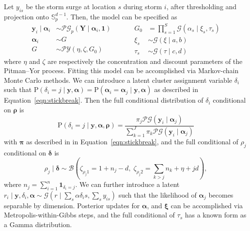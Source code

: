 Let $y_{is}$ be the storm surge at location $s$ during storm $i$, after thresholding 
    and projection onto $\mathbb{S}_p^{d-1}$.  Then, the model can be specified as
    \begin{equation}
        \label{eqn:pypg}
        \begin{aligned}
            \bm{y}_i \mid \bm{\alpha}_i &\sim
                \mathcal{PG}_p\left(\bm{Y}\mid\bm{\alpha}_i,\bm{1}\right)\\
            \bm{\alpha}_i &\sim G\\
            G &\sim \mathcal{PY}\left(\eta, \zeta, G_0\right)        
        \end{aligned}
        ~\hspace{1cm}
        \begin{aligned}
            G_0 &= {\textstyle\prod}_{s = 1}^{S}
                \mathcal{G}(\alpha_{s}\mid \xi_{s},\tau_{s})\\
            \xi_{s} &\sim \mathcal{G}(\xi\mid a, b)\\
            \tau_{s} &\sim \mathcal{G}(\tau\mid c, d)
        \end{aligned} 
    \end{equation}
    where $\eta$ and $\zeta$ are respectively the concentration and discount parameters
    of the Pitman--Yor process.  Fitting this model can be accomplished via Markov-chain 
    Monte Carlo methods. We can introduce a latent cluster assignment variable $\delta_i$ 
    such that 
    $\text{P}\left(\delta_i = j\mid\bm{y},\bm{\alpha}\right) = 
        \text{P}\left(\bm{\alpha}_i = \bm{\alpha}_j\mid \bm{y},\bm{\alpha}\right)$ as 
        described in Equation~\eqref{eqn:stickbreak}.
    Then the full conditional distribution of $\delta_i$ conditional on $\bm{\rho}$ is
    \begin{equation}
        \label{eqn:pdelta}
        \text{P}\left(\delta_i = j\mid \bm{y},\bm{\alpha},\bm{\rho}\right) = 
            \frac{\pi_j\mathcal{PG}(\bm{y}_i\mid\bm{\alpha}_j)}{
                \sum_{k = 1}^J \pi_k\mathcal{PG}(\bm{y}_i\mid\bm{\alpha}_j)}
    \end{equation}
    with $\bm{\pi}$ as described in in Equation~\eqref{eqn:stickbreak},
    and the full conditional of $\rho_j$ conditional on $\bm{\delta}$ is
    \begin{equation}
        \label{eqn:pchi}
            \rho_j\mid\bm{\delta} \sim \mathcal{B}\left(\zeta_{\rho_j 1} = 1 + n_j - d,\; 
                    \zeta_{\rho_j 2} = {\textstyle \sum}_{k>j} n_k + \eta + jd\right),
    \end{equation}
    where $n_j = \sum_{i = 1}^n\bm{1}_{\delta_i = j}$.
    We can further introduce a latent $r_i\mid \bm{y}, \delta_i,\bm{\alpha} \sim 
        \mathcal{G}\left(r\mid \sum_s \alpha{\delta_is},\sum_s y_{is}\right)$ such 
    that the likelihood of $\bm{\alpha}_j$ becomes separable by dimension.  Posterior 
    updates for $\bm{\alpha}$, and $\bm{\xi}$ can be accomplished via 
    Metropolis-within-Gibbs steps, and the full conditional of $\tau_s$ has a known 
    form as a Gamma distribution.

